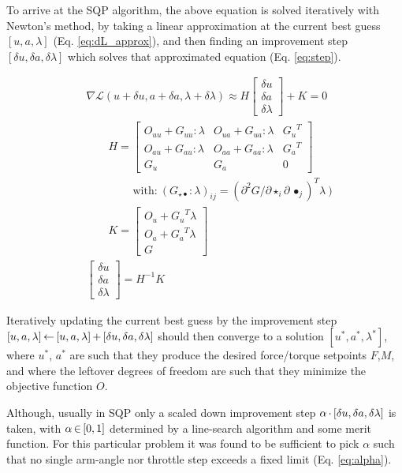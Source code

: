 \documentclass[conference]{IEEEtran}
\newcommand{\m}[1]{\begin{bmatrix}#1\end{bmatrix}}
\newcommand{\mcomp}{\thinmuskip=3mu\medmuskip=3mu\thickmuskip=3mu}
\begin{document}
\vspace{0pt}\par
To arrive at the SQP algorithm, the above equation is solved iteratively with Newton's method, by taking a linear approximation at the current best guess $[u,a,\lambda]$ (Eq. \ref{eq:dL_approx}), and then finding an improvement step $[\delta u, \delta a, \delta \lambda]$ which solves that approximated equation (Eq. \ref{eq:step}).
\par
\begin{align}
	&\nabla\mathcal{L}(u+\delta u,a+\delta a,\lambda+\delta \lambda) \approx H\m{\delta u \\ \delta a \\ \delta \lambda} + K = 0 \label{eq:dL_approx}\\
	&\qquad H = \m{O_{uu} + G_{uu} : \lambda & O_{ua} + G_{ua} : \lambda  & {G_u}^T \\ O_{au} + G_{au} : \lambda & O_{aa} + G_{aa} : \lambda  & {G_a}^T \\ G_u & G_a & 0} \label{eq:H}\\
	&\qquad\qquad\ \textrm{with:}\ (G_{\star \bullet}:\lambda)_{ij} = (\partial^2 G / \partial \star_i \partial \, \bullet_j )^T\lambda\ ) \nonumber\\
	&\qquad K = \m{O_u + {G_u}^T \lambda \\ O_a + {G_a}^T \lambda \\ G} \label{eq:K}\\
	&\m{\delta u \\ \delta a \\ \delta \lambda} = H^{-1}K \label{eq:step}
\end{align}
\vspace{0pt}\par
Iteratively updating the current best guess by the improvement step $\mcomp [u,a,\lambda] \leftarrow [u,a,\lambda] + [\delta u, \delta a, \delta \lambda]$ should then converge to a solution $[u^*,a^*,\lambda^*]$, where $u^*$, $a^*$ are such that they produce the desired force/torque setpoints $F$,$M$, and where the leftover degrees of freedom are such that they minimize the objective function $O$.
\par
Although, usually in SQP only a scaled down improvement step $\mcomp\alpha\cdot[\delta u, \delta a, \delta \lambda]$ is taken, with $\mcomp \alpha\in[0,1]$ determined by a line-search algorithm and some merit function. For this particular problem it was found to be sufficient to pick $\alpha$ such that no single arm-angle nor throttle step exceeds a fixed limit (Eq. \ref{eq:alpha}).
\end{document}
